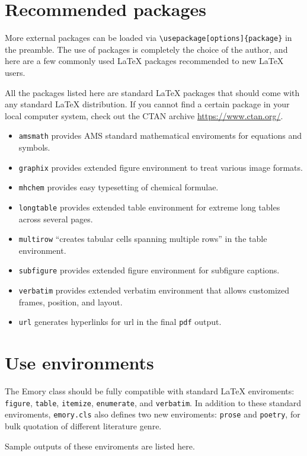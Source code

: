 \documentclass[draft,double,twocolumn]{emory}
\begin{document}
\section{Recommended packages}
More external packages can be loaded via \verb|\usepackage[options]{package}|
in the preamble. The use of packages is completely the choice of the author,
and here are a few commonly used \LaTeX{} packages recommended to new \LaTeX{}
users.

All the packages listed here are standard \LaTeX{} packages that should come
with any standard \LaTeX{} distribution. If you cannot find a certain package 
in your local computer system, check out the CTAN archive \url{https://www.ctan.org/}.

\begin{itemize}
\item \verb|amsmath| provides AMS standard mathematical enviroments for equations and symbols.
\item \verb|graphix| provides extended figure environment to treat various image formats.
\item \verb|mhchem| provides easy typesetting of chemical formulae.
\item \verb|longtable| provides extended table environment for extreme long tables
across several pages.
\item \verb|multirow| ``creates tabular cells spanning multiple rows'' in the table environment.
\item \verb|subfigure| provides extended figure environment for subfigure captions. 
\item \verb|verbatim| provides extended verbatim environment that allows customized 
frames, position, and layout.
\item \verb|url| generates hyperlinks for url in the final \verb|pdf| output.
\end{itemize}


\section{Use environments}\label{sec:env}
The Emory class should be fully compatible with standard \LaTeX{} enviroments:
\verb|figure|, \verb|table|, \verb|itemize|, \verb|enumerate|, and \verb|verbatim|.
In addition to these standard enviroments, \verb|emory.cls| also defines two new
enviroments: \verb|prose| and \verb|poetry|, for bulk quotation of different literature genre.

Sample outputs of these enviroments are listed here. 
\end{document}
